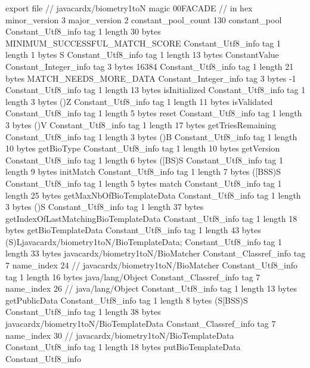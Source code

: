 export file {		// javacardx/biometry1toN
	magic	00FACADE		 // in hex
	minor_version	3
	major_version	2
	constant_pool_count	130
	constant_pool {
		Constant_Utf8_info {
			tag	1
			length	30
			bytes	MINIMUM_SUCCESSFUL_MATCH_SCORE
		}
		Constant_Utf8_info {
			tag	1
			length	1
			bytes	S
		}
		Constant_Utf8_info {
			tag	1
			length	13
			bytes	ConstantValue
		}
		Constant_Integer_info {
			tag	3
			bytes	16384
		}
		Constant_Utf8_info {
			tag	1
			length	21
			bytes	MATCH_NEEDS_MORE_DATA
		}
		Constant_Integer_info {
			tag	3
			bytes	-1
		}
		Constant_Utf8_info {
			tag	1
			length	13
			bytes	isInitialized
		}
		Constant_Utf8_info {
			tag	1
			length	3
			bytes	()Z
		}
		Constant_Utf8_info {
			tag	1
			length	11
			bytes	isValidated
		}
		Constant_Utf8_info {
			tag	1
			length	5
			bytes	reset
		}
		Constant_Utf8_info {
			tag	1
			length	3
			bytes	()V
		}
		Constant_Utf8_info {
			tag	1
			length	17
			bytes	getTriesRemaining
		}
		Constant_Utf8_info {
			tag	1
			length	3
			bytes	()B
		}
		Constant_Utf8_info {
			tag	1
			length	10
			bytes	getBioType
		}
		Constant_Utf8_info {
			tag	1
			length	10
			bytes	getVersion
		}
		Constant_Utf8_info {
			tag	1
			length	6
			bytes	([BS)S
		}
		Constant_Utf8_info {
			tag	1
			length	9
			bytes	initMatch
		}
		Constant_Utf8_info {
			tag	1
			length	7
			bytes	([BSS)S
		}
		Constant_Utf8_info {
			tag	1
			length	5
			bytes	match
		}
		Constant_Utf8_info {
			tag	1
			length	25
			bytes	getMaxNbOfBioTemplateData
		}
		Constant_Utf8_info {
			tag	1
			length	3
			bytes	()S
		}
		Constant_Utf8_info {
			tag	1
			length	37
			bytes	getIndexOfLastMatchingBioTemplateData
		}
		Constant_Utf8_info {
			tag	1
			length	18
			bytes	getBioTemplateData
		}
		Constant_Utf8_info {
			tag	1
			length	43
			bytes	(S)Ljavacardx/biometry1toN/BioTemplateData;
		}
		Constant_Utf8_info {
			tag	1
			length	33
			bytes	javacardx/biometry1toN/BioMatcher
		}
		Constant_Classref_info {
			tag	7
			name_index	24		// javacardx/biometry1toN/BioMatcher
		}
		Constant_Utf8_info {
			tag	1
			length	16
			bytes	java/lang/Object
		}
		Constant_Classref_info {
			tag	7
			name_index	26		// java/lang/Object
		}
		Constant_Utf8_info {
			tag	1
			length	13
			bytes	getPublicData
		}
		Constant_Utf8_info {
			tag	1
			length	8
			bytes	(S[BSS)S
		}
		Constant_Utf8_info {
			tag	1
			length	38
			bytes	javacardx/biometry1toN/BioTemplateData
		}
		Constant_Classref_info {
			tag	7
			name_index	30		// javacardx/biometry1toN/BioTemplateData
		}
		Constant_Utf8_info {
			tag	1
			length	18
			bytes	putBioTemplateData
		}
		Constant_Utf8_info {
}}}
